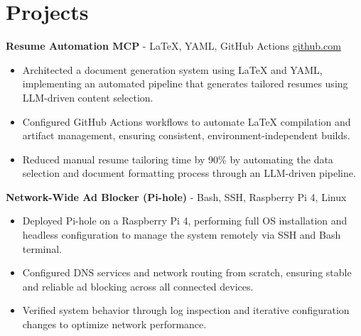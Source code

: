 \documentclass[11pt]{article}       %
\begin{document}

\vspace{-18.5pt}

\section*{Projects}

\textbf{Resume Automation MCP}{ - LaTeX, YAML, GitHub Actions} \hfill \href{https://github.com/Monica20030707/Tex_OrangeLeaf-mcp}{github.com} \\
\vspace{-9pt}
\begin{itemize}
  \item Architected a document generation system using LaTeX and YAML, implementing an automated pipeline that generates tailored resumes using LLM-driven content selection.
  \item Configured GitHub Actions workflows to automate LaTeX compilation and artifact management, ensuring consistent, environment-independent builds.
  \item Reduced manual resume tailoring time by 90\% by automating the data selection and document formatting process through an LLM-driven pipeline.
\end{itemize}

\textbf{Network-Wide Ad Blocker (Pi-hole)}{ - Bash, SSH, Raspberry Pi 4, Linux} \\
\vspace{-9pt}
\begin{itemize}
  \item Deployed Pi-hole on a Raspberry Pi 4, performing full OS installation and headless configuration to manage the system remotely via SSH and Bash terminal.
  \item Configured DNS services and network routing from scratch, ensuring stable and reliable ad blocking across all connected devices.
  \item Verified system behavior through log inspection and iterative configuration changes to optimize network performance.
\end{itemize}
\end{document}
